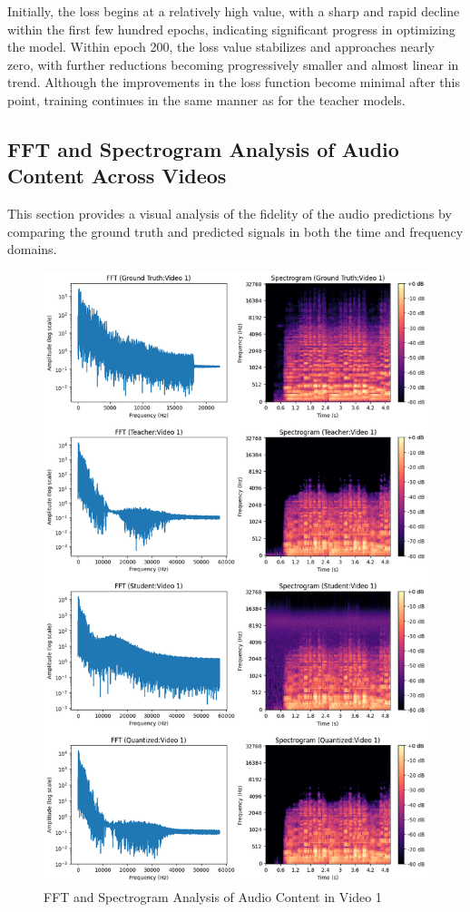 Initially, the loss begins at a relatively high value, with a sharp and rapid decline within the first few hundred epochs, indicating significant progress in optimizing the model. Within epoch 200, the loss value stabilizes and approaches nearly zero, with further reductions becoming progressively smaller and almost linear in trend. Although the improvements in the loss function become minimal after this point, training continues in the same manner as for the teacher models.

\subsection{FFT and Spectrogram Analysis of Audio Content Across Videos}
This section provides a visual analysis of the fidelity of the audio predictions by comparing the ground truth and predicted signals in both the time and frequency domains.

\begin{figure}[H]
    \centering
    \includegraphics[width=0.8\linewidth]{assets/quantization/fft_spectrogram_Video1.png}
    \caption{FFT and Spectrogram Analysis of Audio Content in Video 1}
    \label{fig:fft-spec-v1}
\end{figure}

